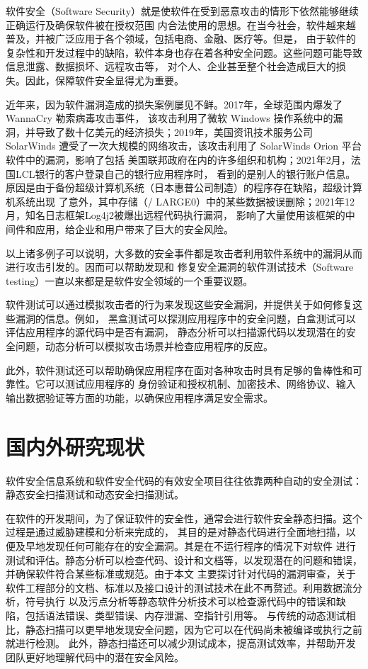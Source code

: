 \documentclass[bachelor]{njupthesis}
\begin{document}
软件安全（Software Security）就是使软件在受到恶意攻击的情形下依然能够继续正确运行及确保软件被在授权范围
内合法使用的思想。在当今社会，软件越来越普及，并被广泛应用于各个领域，包括电商、金融、医疗等。但是，
由于软件的复杂性和开发过程中的缺陷，软件本身也存在着各种安全问题。这些问题可能导致信息泄露、数据损坏、远程攻击等，
对个人、企业甚至整个社会造成巨大的损失。因此，保障软件安全显得尤为重要。

近年来，因为软件漏洞造成的损失案例屡见不鲜。2017年，全球范围内爆发了 WannaCry 勒索病毒攻击事件，
该攻击利用了微软 Windows 操作系统中的漏洞，并导致了数十亿美元的经济损失；2019年，美国资讯技术服务公司 SolarWinds 
遭受了一次大规模的网络攻击，该攻击利用了 SolarWinds Orion 平台软件中的漏洞，影响了包括
美国联邦政府在内的许多组织和机构；2021年2月，法国LCL银行的客户登录自己的银行应用程序时，
看到的是别人的银行账户信息。原因是由于备份超级计算机系统（日本惠普公司制造）的程序存在缺陷，超级计算机系统出现
了意外，其中存储（/ LARGE0）中的某些数据被误删除；2021年12月，知名日志框架Log4j2被爆出远程代码执行漏洞，
影响了大量使用该框架的中间件和应用，给企业和用户带来了巨大的安全风险。

以上诸多例子可以说明，大多数的安全事件都是攻击者利用软件系统中的漏洞从而进行攻击引发的。因而可以帮助发现和
修复安全漏洞的软件测试技术（Software testing）一直以来都是是软件安全领域的一个重要议题。

软件测试可以通过模拟攻击者的行为来发现这些安全漏洞，并提供关于如何修复这些漏洞的信息。例如，
黑盒测试可以探测应用程序中的安全问题，白盒测试可以评估应用程序的源代码中是否有漏洞，
静态分析可以扫描源代码以发现潜在的安全问题，动态分析可以模拟攻击场景并检查应用程序的反应。

此外，软件测试还可以帮助确保应用程序在面对各种攻击时具有足够的鲁棒性和可靠性。它可以测试应用程序的
身份验证和授权机制、加密技术、网络协议、输入输出数据验证等方面的功能，以确保应用程序满足安全需求。

\section{国内外研究现状}
软件安全信息系统和软件安全代码的有效安全项目往往依靠两种自动的安全测试：静态安全扫描测试和动态安全扫描测试。

在软件的开发期间，为了保证软件的安全性，通常会进行软件安全静态扫描。这个过程是通过威胁建模和分析来完成的，
其目的是对静态代码进行全面地扫描，以便及早地发现任何可能存在的安全漏洞。其是在不运行程序的情况下对软件
进行测试和评估。静态分析可以检查代码、设计和文档等，以发现潜在的问题和错误，并确保软件符合某些标准或规范。由于本文
主要探讨针对代码的漏洞审查，关于软件工程部分的文档、标准以及接口设计的测试技术在此不再赘述。利用数据流分析，符号执行
以及污点分析等静态软件分析技术可以检查源代码中的错误和缺陷，包括语法错误、类型错误、内存泄漏、空指针引用等。
与传统的动态测试相比，静态扫描可以更早地发现安全问题，因为它可以在代码尚未被编译或执行之前就进行检测。
此外，静态扫描还可以减少测试成本，提高测试效率，并帮助开发团队更好地理解代码中的潜在安全风险。
\end{document}
